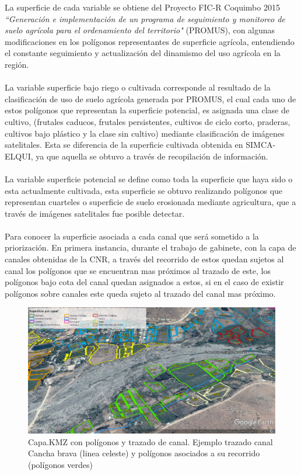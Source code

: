 \documentclass[]{article}
\begin{document}
La superficie de cada variable se obtiene del Proyecto FIC-R Coquimbo 2015 \textit{``Generación e implementación de un programa de seguimiento y monitoreo de suelo agrícola para el ordenamiento del territorio"} (PROMUS), con algunas modificaciones en los polígonos representantes de superficie agrícola, entendiendo el constante seguimiento y actualización del dinamismo del uso agrícola en la región.\\
\\
La variable superficie bajo riego o cultivada corresponde al resultado de la clasificación de uso de suelo agrícola generada por PROMUS, el cual cada uno de estos polígonos que representan la superficie potencial, es asignada una clase de cultivo, (frutales caducos, frutales persistentes, cultivos de ciclo corto, praderas, cultivos bajo plástico y la clase sin cultivo) mediante clasificación de imágenes satelitales. Esta se diferencia de la superficie cultivada obtenida en SIMCA-ELQUI, ya que aquella se obtuvo a través de recopilación de información.\\
\\
La variable superficie potencial se define como toda la superficie que haya sido o esta actualmente cultivada, esta superficie se obtuvo realizando polígonos que representan cuarteles o superficie de suelo erosionada mediante agricultura, que a través de imágenes satelitales fue posible detectar.\\
\\
Para conocer la superficie asociada a cada canal que será sometido a la priorización. En primera instancia, durante el trabajo de gabinete, con la capa de canales obtenidas de la CNR, a través del recorrido de estos quedan sujetos al canal los polígonos que se encuentran mas próximos al trazado de este, los polígonos bajo cota del canal quedan asignados a estos, si en el caso de existir polígonos sobre canales este queda sujeto al trazado del canal mas próximo.

\begin{figure}[h]
\centering
\includegraphics[width=\textwidth]{images/capa_kmz_area.eps}
\caption{Capa.KMZ con polígonos y trazado de canal. Ejemplo trazado canal Cancha brava (linea celeste) y polígonos asociados a su recorrido (polígonos verdes)}
\label{poligonos}
\end{figure}
\end{document}
